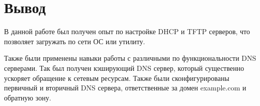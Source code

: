 \documentclass[a4paper, 12pt]{article}		%
\begin{document}
\section*{Вывод}
В данной работе был получен опыт по настройке DHCP и TFTP серверов, что позволяет загружать по сети ОС или утилиту. 

Также были применены навыки работы с различными по функциональности DNS серверами. Так был получен кэширующий DNS сервер, который существенно ускоряет обращение к сетевым ресурсам. Также были сконфигурированы первичный и вторичный DNS сервера, ответственные за домен example.com и обратную зону.

%
%
\end{document}
